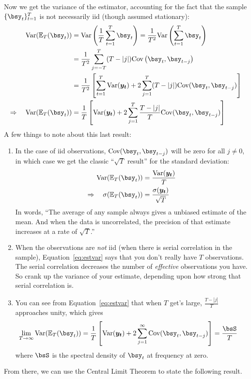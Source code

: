 \documentclass[12pt]{article}
\theoremstyle{plain}
\theoremstyle{definition}
\theoremstyle{remark}
\begin{document}
Now we get the variance of the estimator, accounting for the fact that
the sample $\{\bsy_t\}_{t=1}^T$ is not necessarily iid (though
assumed stationary):
\begin{align}
  \text{Var}(\mathbb{E}_T(\bsy_t))
  &=
  \text{Var}\left(
  \frac{1}{T}\sum^T_{t=1} \bsy_t
  \right)
  =
  \frac{1}{T^2}\text{Var}\left(
  \sum^T_{t=1} \bsy_t
  \right)\notag\\
  &=
  \frac{1}{T^2}
  \sum^T_{j=-T} (T-|j|)\text{Cov}\left(
    \bsy_t, \bsy_{t-j}
  \right) \notag\\
  &=
  \frac{1}{T^2}
  \left[
    \sum^T_{t=1} \text{Var}(\boldsymbol{y_t})
    +
    2\sum^T_{j=1} (T-|j|)\text{Cov}(\bsy_t,\bsy_{t-j})
  \right]\notag\\
  \Rightarrow\quad
  \text{Var}(\mathbb{E}_T(\bsy_t))
  &=
  \frac{1}{T}
  \left[
    \text{Var}(\boldsymbol{y_t})
    +
    2\sum^T_{j=1} \frac{T-|j|}{T}
    \text{Cov}(\bsy_t,\bsy_{t-j})
  \right]
  \label{eq:estvar}
\end{align}
A few things to note about this last result:
\begin{enumerate}
  \item In the case of iid observations,
    $\text{Cov}(\bsy_t,\bsy_{t-j})$ will be zero for
    all $j\neq 0$, in which case we get the classic ``$\sqrt{T}$
    result'' for the standard deviation:
    \begin{align*}
      \text{Var}(\mathbb{E}_T(\bsy_t))
      &=
      \frac{\text{Var}(\boldsymbol{y_t})}{T}\\
      \Rightarrow\quad
      \sigma(\mathbb{E}_T(\bsy_t))
      &=
      \frac{\sigma(\boldsymbol{y_t})}{\sqrt{T}}
    \end{align*}
    In words, ``The average of any sample always gives a unbiased
    estimate of the mean. And when the data is uncorrelated, the
    precision of that estimate increases at a rate of $\sqrt{T}$.''

  \item When the observations are \emph{not} iid (when there is serial
    correlation in the sample), Equation~\ref{eq:estvar} says that you
    don't really have $T$ observations. The serial correlation decreases
    the number of \emph{effective} observations you have. So crank up
    the variance of your estimate, depending upon how strong that serial
    correlation is.

  \item
    You can see from Equation~\ref{eq:estvar} that when $T$ get's large,
    $\frac{T-|j|}{T}$ approaches unity, which gives
    \begin{align*}
      \lim_{T\rightarrow\infty}
      \text{Var}(\mathbb{E}_T(\bsy_t))
      &=
      \frac{1}{T}
      \left[
        \text{Var}(\boldsymbol{y_t})
        +
        2\sum^\infty_{j=1}
        \text{Cov}(\bsy_t,\bsy_{t-j})
      \right]
      =
      \frac{\bsS}{T}
    \end{align*}
    where $\bsS$ is the spectral density of $\bsy_t$
    at frequency at zero.
\end{enumerate}
From there, we can use the Central Limit Theorem to state the following
result.
\end{document}
